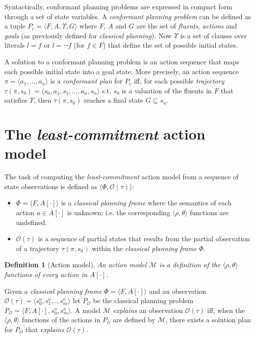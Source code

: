 \documentclass{article}
\newcommand{\tup}[1]{{\langle #1 \rangle}}
\newtheorem{definition}[theorem]{Definition}
\begin{document}
Syntactically, conformant planning problems are expressed in compact form through a set of state variables. A {\em conformant planning problem} can be defined as a tuple $P_c=\tup{F,A,\Upsilon,G}$ where $F$, $A$ and $G$ are the set of {\em fluents}, {\em actions} and {\em goals} (as previously defined for {\em classical planning}). Now $\Upsilon$ is a set of clauses over literals $l=f$ or $l=\neg f$ (for $f\in F$) that define the set of possible initial states. 

A solution to a conformant planning problem is an action sequence that maps each possible initial state into a goal state. More precisely, an action sequence $\pi=\tup{a_1, \ldots, a_n}$ is a {\em conformant plan} for $P_c$ iff, for each possible {\em trajectory} $\tau(\pi,s_0)=\tup{s_0, a_1, s_1, \ldots, a_n, s_n}$ s.t. $s_0$ is a valuation of the fluents in $F$ that satisfies $\Upsilon$, then $\tau(\pi,s_0)$ reaches a final state $G \subseteq s_n$. 


\section{The {\em least-commitment} action model}
The task of computing the {\em least-commitment} action model from a sequence of state observations is defined as $\tup{\Phi,\mathcal{O}(\tau)}$:
\begin{itemize}
\item $\Phi=\tup{F,A[\cdot]}$ is a {\em classical planning frame} where the semantics of each action $a\in A[\cdot]$ is unknown; i.e. the corresponding $\tup{\rho,\theta}$ functions are undefined. 
\item $\mathcal{O}(\tau)$ is a sequence of partial states that results from the partial observation of a trajectory $\tau(\pi,s_0)$ within the {\em classical planning frame} $\Phi$.
\end{itemize}

\begin{definition}[Action model]
An {\em action model} $\mathcal{M}$ is a definition of the $\tup{\rho,\theta}$ functions of every action in $A[\cdot]$. 
\end{definition}

Given a {\em classical planning frame} $\Phi=\tup{F,A[\cdot]}$ and an observation $\mathcal{O}(\tau)=\tup{s_0^o,s_1^o \ldots , s_m^o}$ let $P_\mathcal{O}$ be the classical planning problem $P_\mathcal{O}=\tup{F,A[\cdot],s_0^o,s_m^o}$. A model $\mathcal{M}$ {\em explains} an observation $\mathcal{O}(\tau)$ iff, when the $\tup{\rho,\theta}$ functions of the actions in $P_\mathcal{O}$ are defined by $\mathcal{M}$, there exists a solution plan for $P_\mathcal{O}$ that {\em explains} $\mathcal{O}(\tau)$.  
\end{document}
